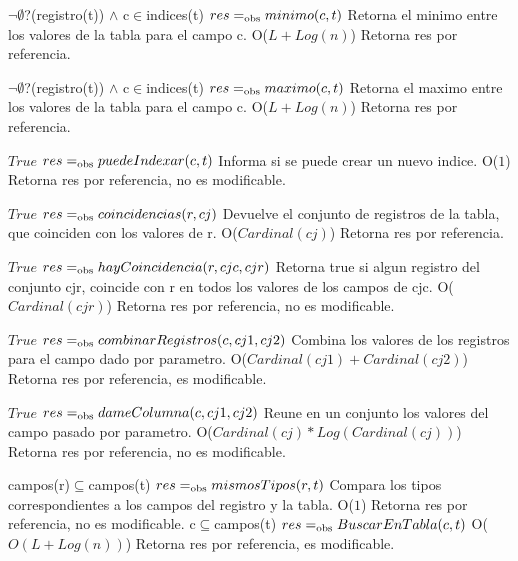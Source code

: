  {$\neg\emptyset$?(registro(t)) $\land$ c$\in$indices(t)}
 {$res =_{\mathrm{obs}} minimo(c,t)$}
 {Retorna el minimo entre los valores de la tabla para el campo c.}
 {O($L+Log(n)$)}
 {Retorna res por referencia.}
  
 {$\neg\emptyset$?(registro(t)) $\land$ c$\in$indices(t)}
 {$res =_{\mathrm{obs}} maximo(c,t)$}
 {Retorna el maximo entre los valores de la tabla para el campo c.}
 {O($L+Log(n)$)}
 {Retorna res por referencia.} 

 {$True$}
 {$res =_{\mathrm{obs}} puedeIndexar(c,t)$}
 {Informa si se puede crear un nuevo indice.}
 {O($1$)}
 {Retorna res por referencia, no es modificable.}

 {$True$}
 {$res =_{\mathrm{obs}} coincidencias(r,cj)$}
 {Devuelve el conjunto de registros de la tabla, que coinciden con los valores de r.}
 {O($Cardinal(cj)$)}
 {Retorna res por referencia.} 

 {$True$}
 {$res =_{\mathrm{obs}} hayCoincidencia(r,cjc,cjr)$}
 {Retorna true si algun registro del conjunto cjr, coincide con r en todos los valores de los campos de cjc.}
 {O($Cardinal(cjr)$)}
 {Retorna res por referencia, no es modificable.} 


 {$True$}
 {$res =_{\mathrm{obs}} combinarRegistros(c,cj1,cj2)$}
 {Combina los valores de los registros para el campo dado por parametro.}
 {O($Cardinal(cj1)+Cardinal(cj2)$)}
 {Retorna res por referencia, es modificable.}

 {$True$}
 {$res =_{\mathrm{obs}} dameColumna(c,cj1,cj2)$}
 {Reune en un conjunto los valores del campo pasado por parametro.}
 {O($Cardinal(cj)*Log(Cardinal(cj))$)}
 {Retorna res por referencia, no es modificable.} 

 {campos(r)$\subseteq$campos(t)}
 {$res =_{\mathrm{obs}} mismosTipos(r,t)$}
 {Compara los tipos correspondientes a los campos del registro y la tabla.}
 {O($1$)}
 {Retorna res por referencia, no es modificable.} 
\newpage
 {c$\subseteq$campos(t)}
 {$res =_{\mathrm{obs}} BuscarEnTabla(c, t)$}
 {}
 {O($O(L+Log(n))$)}
 {Retorna res por referencia, es modificable.} 
 
